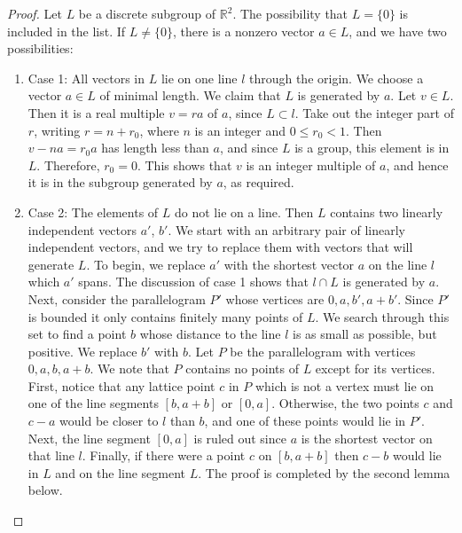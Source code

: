 \documentclass[12pt]{article}
\theoremstyle{definition}
\theoremstyle{remark}
\numberwithin{equation}{section}
\newcommand\R{\mathbb R}    %
\begin{document}
\begin{proof}
        Let $L$ be a discrete subgroup of $\R^2$. The possibility that $L =\{0\}$ is included in the list. If $L \neq \{0\}$, there is a nonzero vector $a \in L$, and we have two possibilities: \begin{enumerate}
                \item[] Case 1: All vectors in $L$ lie on one line $l$ through the origin. We choose a vector $a \in L$ of minimal length. We claim that $L$ is generated by $a$. Let $v \in L$. Then it is a real multiple $v = ra$ of $a$, since $L \subset l$. Take out the integer part of $r$, writing $r = n + r_0$, where $n$ is an integer and $0 \leq r_0 < 1$. Then $v - na = r_0a$ has length less than $a$, and since $L$ is a group, this element is in $L$. Therefore, $r_0 = 0$. This shows that $v$ is an integer multiple of $a$, and hence it is in the subgroup generated by $a$, as required.
                \item[] Case 2: The elements of $L$ do not lie on a line. Then $L$ contains two linearly independent vectors $a'$, $b'$. We start with an arbitrary pair of linearly independent vectors, and we try to replace them with vectors that will generate $L$. To begin, we replace $a'$ with the shortest vector $a$ on the line $l$ which $a'$ spans. The discussion of case 1 shows that $l \cap L$ is generated by $a$. Next, consider the parallelogram $P'$ whose vertices are $0,a,b',a+b'$. Since $P'$ is bounded it only contains finitely many points of $L$. We search through this set to find a point $b$ whose distance to the line $l$ is as small as possible, but positive. We replace $b'$ with $b$. Let $P$ be the parallelogram with vertices $0,a,b,a+b$. We note that $P$ contains no points of $L$ except for its vertices. First, notice that any lattice point $c$ in $P$ which is not a vertex must lie on one of the line segments $[b,a+b]$ or $[0,a]$. Otherwise, the two points $c$ and $c - a$ would be closer to $l$ than $b$, and one of these points would lie in $P'$. Next, the line segment $[0,a]$ is ruled out since $a$ is the shortest vector on that line $l$. Finally, if there were a point $c$ on $[b,a+b]$ then $c-b$ would lie in $L$ and on the line segment $L$. The proof is completed by the second lemma below.
        \end{enumerate}
\end{proof}

\vspace{15pt}
\end{document}
